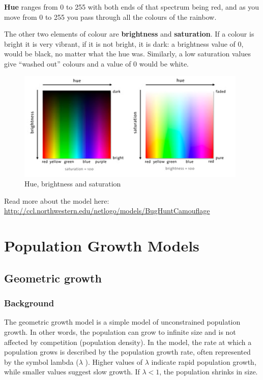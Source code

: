 \documentclass[
  a4paper]{book}
\begin{document}
\textbf{Hue} ranges from 0 to 255 with both ends of that spectrum being red, and as you move from 0 to 255 you pass through all the colours of the rainbow.

The other two elements of colour are \textbf{brightness} and \textbf{saturation}. If a colour is bright it is very vibrant, if it is not bright, it is dark: a brightness value of 0, would be black, no matter what the hue was. Similarly, a low saturation values give ``washed out'' colours and a value of 0 would be white.

\begin{figure}

{\centering \includegraphics[width=0.5\linewidth]{images/colours} 

}

\caption{Hue, brightness and saturation}\label{fig:colours}
\end{figure}

Read more about the model here: \url{http://ccl.northwestern.edu/netlogo/models/BugHuntCamouflage}

\part{Population Growth Models}\label{part-population-growth-models}

\chapter{Geometric growth}\label{geometric-growth}

\section{Background}\label{background-2}

The geometric growth model is a simple model of unconstrained population growth. In other words, the population can grow to infinite size and is not affected by competition (population density). In the model, the rate at which a population grows is described by the population growth rate, often represented by the symbol lambda (\(\lambda\) ). Higher values of \(\lambda\) indicate rapid population growth, while smaller values suggest slow growth. If \(\lambda < 1\), the population shrinks in size.
\end{document}
